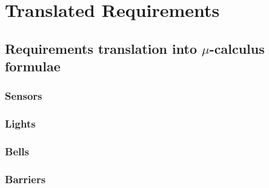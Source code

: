 \documentclass[final]{report}
\begin{document}
\chapter{Translated Requirements}

\section{Requirements translation into $\mu$-calculus formulae}

\subsection{Sensors}

\subsection{Lights}

\subsection{Bells}

\subsection{Barriers}
\end{document}
